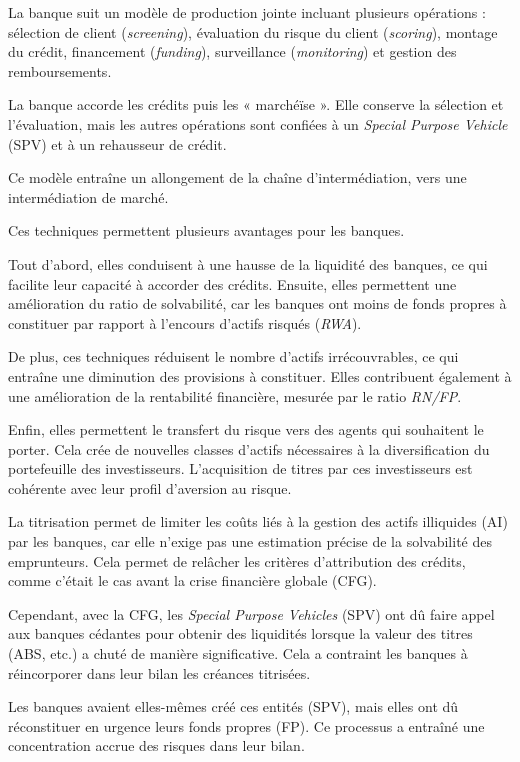 \documentclass[a4paper, 12pt]{report}
\begin{document}
La banque suit un modèle de production jointe incluant plusieurs opérations : sélection de client (\textit{screening}), évaluation du risque du client (\textit{scoring}), montage du crédit, financement (\textit{funding}), surveillance (\textit{monitoring}) et gestion des remboursements.

La banque accorde les crédits puis les « marchéïse ». Elle conserve la sélection et l’évaluation, mais les autres opérations sont confiées à un \textit{Special Purpose Vehicle} (SPV) et à un rehausseur de crédit.

Ce modèle entraîne un allongement de la chaîne d’intermédiation, vers une intermédiation de marché.

Ces techniques permettent plusieurs avantages pour les banques.

Tout d'abord, elles conduisent à une hausse de la liquidité des banques, ce qui facilite leur capacité à accorder des crédits. Ensuite, elles permettent une amélioration du ratio de solvabilité, car les banques ont moins de fonds propres à constituer par rapport à l'encours d'actifs risqués (\textit{RWA}).

De plus, ces techniques réduisent le nombre d'actifs irrécouvrables, ce qui entraîne une diminution des provisions à constituer. Elles contribuent également à une amélioration de la rentabilité financière, mesurée par le ratio \textit{RN/FP}.

Enfin, elles permettent le transfert du risque vers des agents qui souhaitent le porter. Cela crée de nouvelles classes d'actifs nécessaires à la diversification du portefeuille des investisseurs. L'acquisition de titres par ces investisseurs est cohérente avec leur profil d'aversion au risque.

La titrisation permet de limiter les coûts liés à la gestion des actifs illiquides (AI) par les banques, car elle n'exige pas une estimation précise de la solvabilité des emprunteurs. Cela permet de relâcher les critères d'attribution des crédits, comme c'était le cas avant la crise financière globale (CFG).

Cependant, avec la CFG, les \textit{Special Purpose Vehicles} (SPV) ont dû faire appel aux banques cédantes pour obtenir des liquidités lorsque la valeur des titres (ABS, etc.) a chuté de manière significative. Cela a contraint les banques à réincorporer dans leur bilan les créances titrisées.

Les banques avaient elles-mêmes créé ces entités (SPV), mais elles ont dû réconstituer en urgence leurs fonds propres (FP). Ce processus a entraîné une concentration accrue des risques dans leur bilan.
\end{document}
